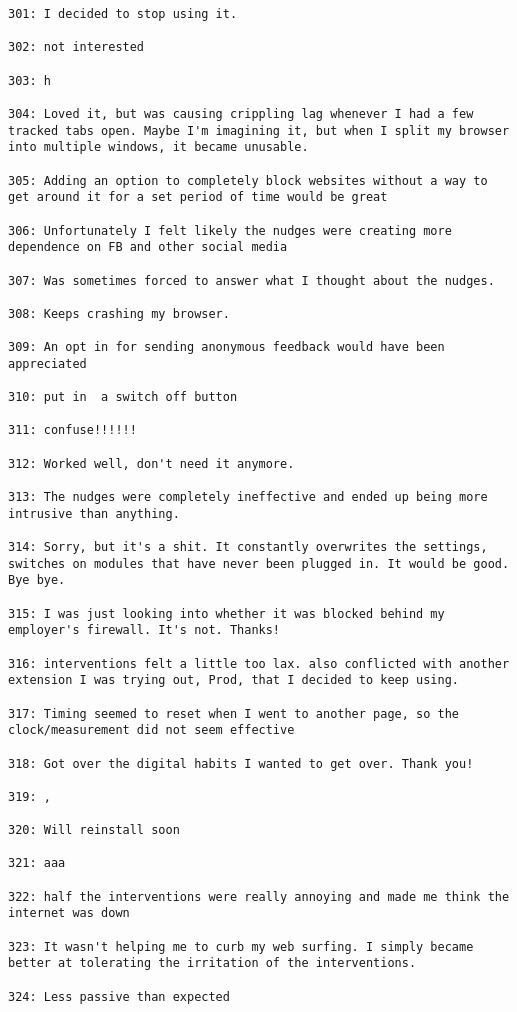 \begin{lstlisting}[breaklines]
301: I decided to stop using it.

302: not interested

303: h

304: Loved it, but was causing crippling lag whenever I had a few tracked tabs open. Maybe I'm imagining it, but when I split my browser into multiple windows, it became unusable.

305: Adding an option to completely block websites without a way to get around it for a set period of time would be great

306: Unfortunately I felt likely the nudges were creating more dependence on FB and other social media

307: Was sometimes forced to answer what I thought about the nudges.

308: Keeps crashing my browser.

309: An opt in for sending anonymous feedback would have been appreciated

310: put in  a switch off button

311: confuse!!!!!!

312: Worked well, don't need it anymore.

313: The nudges were completely ineffective and ended up being more intrusive than anything.

314: Sorry, but it's a shit. It constantly overwrites the settings, switches on modules that have never been plugged in. It would be good. Bye bye.

315: I was just looking into whether it was blocked behind my employer's firewall. It's not. Thanks!

316: interventions felt a little too lax. also conflicted with another extension I was trying out, Prod, that I decided to keep using.

317: Timing seemed to reset when I went to another page, so the clock/measurement did not seem effective

318: Got over the digital habits I wanted to get over. Thank you!

319: ,

320: Will reinstall soon

321: aaa

322: half the interventions were really annoying and made me think the internet was down

323: It wasn't helping me to curb my web surfing. I simply became better at tolerating the irritation of the interventions.

324: Less passive than expected


\end{lstlisting}
